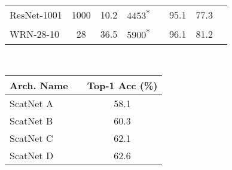 \begin{table}
\begin{tabular}{@{}lccccccc@{}}
    ResNet-1001\cite{he_identity_2016} & 1000 & 10.2 & 4453\textsuperscript{*}&& 95.1 & 77.3 \\ %
    WRN-28-10\cite{zagoruyko_wide_2016} & 28 & 36.5 & 5900\textsuperscript{*} && 96.1 & 81.2 \\ %
    \bottomrule
  \end{tabular}
  \\\vspace{20pt}
  \label{tab:ch5:hybrid_scat_ti}
  \begin{tabular}{@{}llc@{}}
    \toprule
    Arch. Name & \phantom{c} & Top-1 Acc (\%)\\\midrule
    ScatNet A && 58.1 \\
    ScatNet B && 60.3 \\\midrule
    ScatNet C && 62.1\\
    ScatNet D && 62.6\\ \bottomrule
  \end{tabular}
\end{table}

